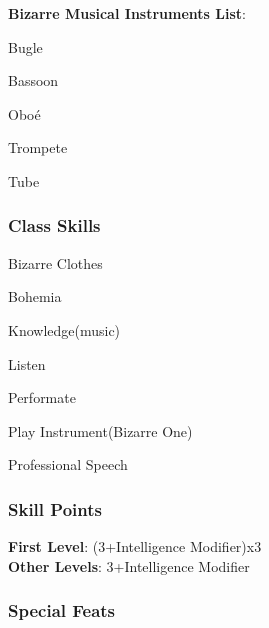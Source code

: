 \documentclass[ letterpaper,12pt]{article}
\begin{document}
{{\bf Bizarre Musical Instruments List}:\\
\begin{itemize}
{\it 
\item{Bugle}
\item{Bassoon}
\item{Oboé}
\item{Trompete}
\item{Tube}
}
\end{itemize}

\subsubsection{Class Skills}
\begin{itemize}
{\it 
\item{Bizarre Clothes}
\item{Bohemia}
\item{Knowledge(music)}
\item{Listen}
\item{Performate}
\item{Play Instrument(Bizarre One)}
\item{Professional Speech}
}
\end{itemize}

\subsubsection{Skill Points}
{\bf First Level}: (3+Intelligence Modifier)x3\\
{\bf Other Levels}: 3+Intelligence Modifier\\

\subsubsection{Special Feats}

}
\end{document}
